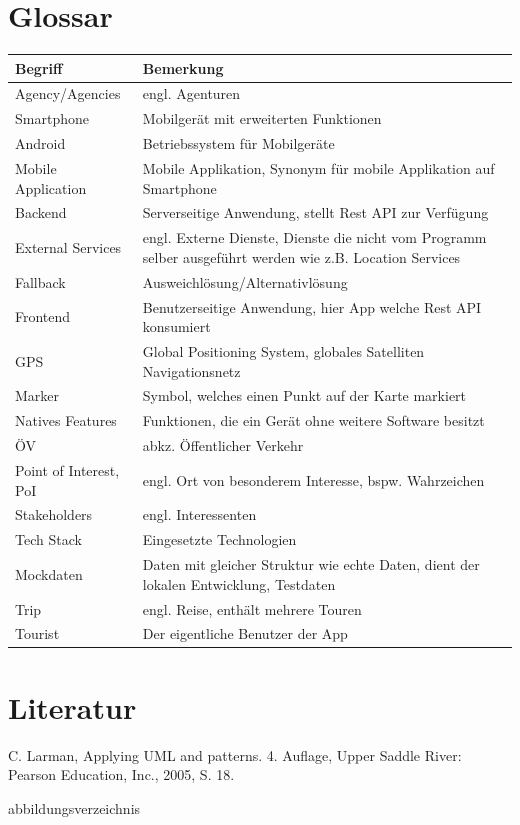 \documentclass[a4paper,10pt,xetex]{article}
\begin{document}
\newpage
\section{Glossar}\label{glossar}
\begin{longtabu} to \textwidth { | l | X[l] | }
\hline
\textbf{Begriff} & \textbf{Bemerkung}\\\hline
\endhead

Agency/Agencies & engl. Agenturen\\\hline
Smartphone & Mobilgerät mit erweiterten Funktionen\\\hline
Android & Betriebssystem für Mobilgeräte\\\hline
Mobile Application & Mobile Applikation, Synonym für mobile Applikation auf Smartphone\\\hline
Backend & Serverseitige Anwendung, stellt Rest API zur Verfügung\\\hline
External Services & engl. Externe Dienste, Dienste die nicht vom Programm selber ausgeführt werden wie z.B. Location Services\\\hline
Fallback & Ausweichlösung/Alternativlösung\\\hline
Frontend & Benutzerseitige Anwendung, hier App welche Rest API konsumiert\\\hline
GPS & Global Positioning System, globales Satelliten Navigationsnetz\\\hline
Marker & Symbol, welches einen Punkt auf der Karte markiert\\\hline
Natives Features & Funktionen, die ein Gerät ohne weitere Software besitzt\\\hline
ÖV & abkz. Öffentlicher Verkehr\\\hline
Point of Interest, PoI & engl. Ort von besonderem Interesse, bspw. Wahrzeichen\\\hline
Stakeholders & engl. Interessenten\\\hline
Tech Stack & Eingesetzte Technologien\\\hline
Mockdaten & Daten mit gleicher Struktur wie echte Daten, dient der lokalen Entwicklung, Testdaten \\\hline
Trip & engl. Reise, enthält mehrere Touren\\\hline
Tourist & Der eigentliche Benutzer der App\\\hline
\end{longtabu}


\section{Literatur}\label{literatur}
\begingroup
\renewcommand{\section}[2]{}%
  \begin{thebibliography}{9}
     C. Larman, Applying UML and patterns. 4. Auflage, Upper Saddle River: Pearson Education, Inc., 2005, S. 18.
  \end{thebibliography}
\endgroup

\section{Abbildungsverzeichnis}\label{abbildungsverzeichnis}
\begingroup
\renewcommand{\section}[2]{}%
\hypersetup{linkcolor=black}
\listoffigures
\endgroup
\end{document}
